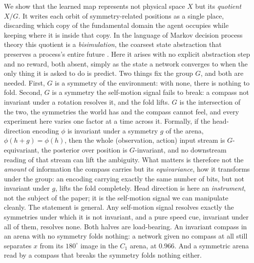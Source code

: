 We show that the learned map represents not physical space $X$ but its \emph{quotient} $X/G$. It
writes each orbit of symmetry-related positions as a single place, discarding which copy of the
fundamental domain the agent occupies while keeping where it is inside that copy. In the language of
Markov decision process theory this quotient is a \emph{bisimulation}, the coarsest state abstraction
that preserves a process's entire future \citep{givan2003, li2006}. Here it arises with no explicit
abstraction step and no reward, both absent, simply as the state a network converges to when the only
thing it is asked to do is predict. Two things fix the group $G$, and both are needed. First, $G$ is a
symmetry of the environment: with none, there is nothing to fold. Second, $G$ is a symmetry the
self-motion signal fails to break: a compass not invariant under a rotation resolves it, and the fold
lifts. $G$ is the intersection of the two, the symmetries the world has and the compass cannot feel,
and every experiment here varies one factor at a time across it. Formally, if the head-direction
encoding $\phi$ is invariant under a symmetry $g$ of the arena, $\phi(h+g)=\phi(h)$, then the whole
(observation, action) input stream is $G$-equivariant, the posterior over position is $G$-invariant,
and no downstream reading of that stream can lift the ambiguity. What matters is therefore not the
\emph{amount} of information the compass carries but its \emph{equivariance}, how it transforms under
the group: an encoding carrying exactly the same number of bits, but not invariant under $g$, lifts
the fold completely. Head direction is here an \emph{instrument}, not the subject of the paper; it is
the self-motion signal we can manipulate cleanly. The statement is general. Any self-motion signal
resolves exactly the symmetries under which it is not invariant, and a pure speed cue, invariant under
all of them, resolves none. Both halves are load-bearing. An invariant compass in an arena with no
symmetry folds nothing: a network given no compass at all still separates $x$ from its $180^\circ$
image in the $C_1$ arena, at $0.966$. And a symmetric arena read by a compass that breaks the symmetry
folds nothing either.

